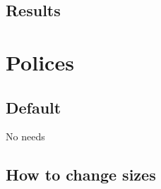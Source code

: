 \documentclass[a4paper,12pt]{article}
\begin{document}
\subsection{Results}
\layout


\newpage
\section{Polices}
\subsection{Default}
No needs
\subsection{How to change sizes}
\end{document}
